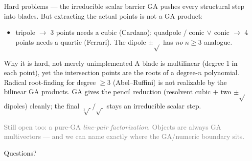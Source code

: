 \documentclass[aspectratio=169, 10pt]{beamer}
\newcommand{\meet}{\vee}
\begin{document}
\begin{frame}[t]{Hard problems --- the irreducible scalar barrier}
  GA pushes every \alert{structural} step into blades. But \alert{extracting the actual
  points is not a GA product}:
  \vspace{0.25cm}
  \begin{itemize}\setlength\itemsep{0.35em}
    \item tripole $\to$ 3 points needs a \alert{cubic} (Cardano);
          quadpole / conic$\,\meet\,$conic $\to$ 4 points needs a \alert{quartic} (Ferrari).
          The dipole $\pm\sqrt{}$ has \emph{no} $n\ge3$ analogue.
  \end{itemize}
  \vspace{0.1cm}
  \begin{alertblock}{Why it is hard, not merely unimplemented}
    A blade is \alert{multilinear} (degree 1 in each point), yet the intersection points are
    the roots of a \alert{degree-$n$ polynomial}. Radical root-finding for degree $\ge3$
    (Abel--Ruffini) is not realizable by the bilinear GA products. GA gives the pencil
    reduction (resolvent cubic $+$ two $\pm\sqrt{}$ dipoles) cleanly; the final
    $\sqrt[3]{\ }/\sqrt{\ }$ stays an irreducible scalar step.
  \end{alertblock}
  \vspace{0.1cm}
  \textcolor{gray}{Still open too: a pure-GA \emph{line-pair factorization}. Objects are always GA multivectors --- and we can name exactly where the GA/numeric boundary sits.}
\end{frame}

{
  \begin{frame}[standout]
    Questions?
  \end{frame}
}
\end{document}
